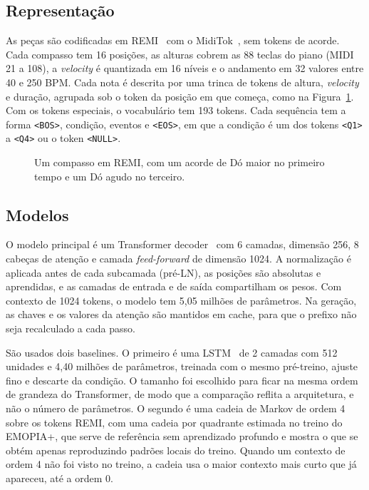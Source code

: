 \documentclass{article}
\begin{document}
\subsection{Representação}

As peças são codificadas em REMI~\cite{Huang2020:remi} com o
MidiTok~\cite{Fradet2021:miditok}, sem tokens de acorde. Cada compasso tem 16
posições, as alturas cobrem as 88 teclas do piano (MIDI 21 a 108), a
\emph{velocity} é quantizada em 16 níveis e o andamento em 32 valores entre 40 e
250 BPM. Cada nota é descrita por uma trinca de tokens de altura,
\emph{velocity} e duração, agrupada sob o token da posição em que começa, como
na Figura~\ref{fig:remi}. Com os tokens especiais, o vocabulário tem 193 tokens.
Cada sequência tem a forma \texttt{<BOS>}, condição, eventos e \texttt{<EOS>},
em que a condição é um dos tokens \texttt{<Q1>} a \texttt{<Q4>} ou o token
\texttt{<NULL>}.

\begin{figure}[t]
  \centering
  \caption{Um compasso em REMI, com um acorde de Dó maior no primeiro tempo e um
    Dó agudo no terceiro.}
  \label{fig:remi}
\end{figure}

\subsection{Modelos}

O modelo principal é um Transformer decoder~\cite{Vaswani2017:attention} com 6
camadas, dimensão 256, 8 cabeças de atenção e camada \emph{feed-forward} de
dimensão 1024. A normalização é aplicada antes de cada subcamada (pré-LN), as
posições são absolutas e aprendidas, e as camadas de entrada e de saída
compartilham os pesos. Com contexto de 1024 tokens, o modelo tem 5,05 milhões de
parâmetros. Na geração, as chaves e os valores da atenção são mantidos em cache,
para que o prefixo não seja recalculado a cada passo.

São usados dois baselines. O primeiro é uma LSTM~\cite{Hochreiter1997:lstm} de 2
camadas com 512 unidades e 4,40 milhões de parâmetros, treinada com o mesmo
pré-treino, ajuste fino e descarte da condição. O tamanho foi escolhido para
ficar na mesma ordem de grandeza do Transformer, de modo que a comparação
reflita a arquitetura, e não o número de parâmetros. O segundo é uma cadeia de
Markov de ordem 4 sobre os tokens REMI, com uma cadeia por quadrante estimada no
treino do EMOPIA+, que serve de referência sem aprendizado profundo e mostra o
que se obtém apenas reproduzindo padrões locais do treino. Quando um contexto de
ordem 4 não foi visto no treino, a cadeia usa o maior contexto mais curto que já
apareceu, até a ordem 0.
\end{document}
